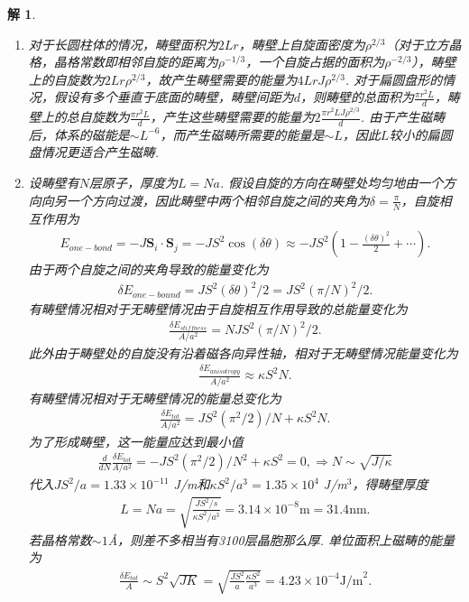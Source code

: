 \documentclass[UTF8,10pt,a4paper]{article}
\theoremstyle{Problem}
\theoremstyle{Solution}
\newtheorem*{sol}{解}
\begin{document}
\begin{sol}
\begin{enumerate}
        \item[(d)] 对于长圆柱体的情况，畴壁面积为$2Lr$，畴壁上自旋面密度为$\rho^{2/3}$（对于立方晶格，晶格常数即相邻自旋的距离为$\rho^{-1/3}$，一个自旋占据的面积为$\rho^{-2/3}$），畴壁上的自旋数为$2Lr\rho^{2/3}$，故产生畴壁需要的能量为$4LrJ\rho^{2/3}$. 对于扁圆盘形的情况，假设有多个垂直于底面的畴壁，畴壁间距为$d$，则畴壁的总面积为$\frac{\pi r^2L}{d}$，畴壁上的总自旋数为$\frac{\pi r^2L}{d}$，产生这些畴壁需要的能量为$2\frac{\pi r^2LJ\rho^{2/3}}{d}$. 由于产生磁畴后，体系的磁能是$\sim L^{-6}$，而产生磁畴所需要的能量是$\sim L$，因此$L$较小的扁圆盘情况更适合产生磁畴.
        \item[(e)] 设畴壁有$N$层原子，厚度为$L=Na$. 假设自旋的方向在畴壁处均匀地由一个方向向另一个方向过渡，因此畴壁中两个相邻自旋之间的夹角为$\delta=\frac{\pi}{N}$，自旋相互作用为
        \begin{align}
            E_{one-bond}=-J\bm{S}_i\cdot\bm{S}_j=-JS^2\cos(\delta\theta)\approx-JS^2\left(1-\frac{(\delta\theta)^2}{2}+\cdots\right).
        \end{align}
        由于两个自旋之间的夹角导致的能量变化为
        \begin{align}
            \delta E_{one-bound}=JS^2(\delta\theta)^2/2=JS^2(\pi/N)^2/2.
        \end{align}
        有畴壁情况相对于无畴壁情况由于自旋相互作用导致的总能量变化为
        \begin{align}
            \frac{\delta E_{stiffness}}{A/a^2}=NJS^2(\pi/N)^2/2.
        \end{align}
        此外由于畴壁处的自旋没有沿着磁各向异性轴，相对于无畴壁情况能量变化为
        \begin{align}
            \frac{\delta E_{anisotropy}}{A/a^2}\approx\kappa S^2N.
        \end{align}
        有畴壁情况相对于无畴壁情况的能量总变化为
        \begin{align}
            \frac{\delta E_{tot}}{A/a^2}=JS^2(\pi^2/2)/N+\kappa S^2N.
        \end{align}
        为了形成畴壁，这一能量应达到最小值
        \begin{align}
            \frac{d}{dN}\frac{\delta E_{tot}}{A/a^2}=-JS^2(\pi^2/2)/N^2+\kappa S^2=0,\Longrightarrow N\sim\sqrt{J/\kappa}
        \end{align}
        代入$JS^2/a=1.33\times 10^{-11}$ J/m和$\kappa S^2/a^3=1.35\times 10^{4}$ J/m$^3$，得畴壁厚度
        \begin{align}
            L=Na=\sqrt{\frac{JS^2/s}{\kappa S^2/a^3}}=3.14\times 10^{-8}\text{m}=31.4\text{nm}.
        \end{align}
        若晶格常数$\sim 1$\AA，则差不多相当有3100层晶胞那么厚. 单位面积上磁畴的能量为
        \begin{align}
            \frac{\delta E_{tot}}{A}\sim S^2\sqrt{JK}=\sqrt{\frac{JS^2}{a}\frac{\kappa S^2}{a^3}}=4.23\times 10^{-4}\text{J/m}^2.
        \end{align}
    \end{enumerate}
\end{sol}
\end{document}
